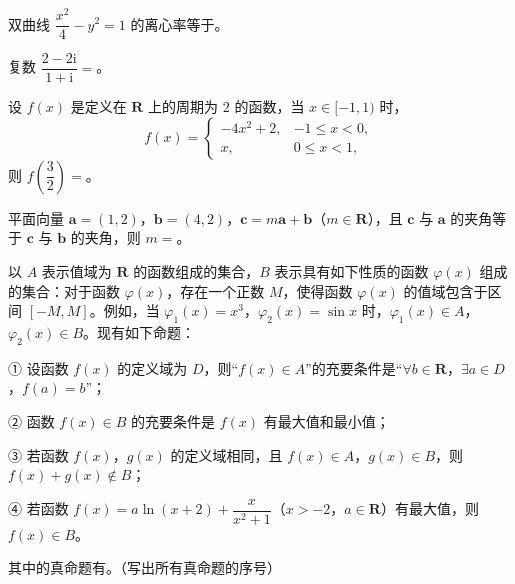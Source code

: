 \begin{question}
双曲线 $\dfrac{x^2}4-y^2=1$ 的离心率等于\gkblank{}。

\end{question}
\begin{question}
复数 $\dfrac{2-2\mathrm i}{1+\mathrm i}=$\gkblank{}。

\end{question}
\begin{question}
设 $f(x)$ 是定义在 $\mathbf R$ 上的周期为 $2$ 的函数，当 $x\in[-1,1)$ 时，
\nopagebreak[4]
\[f(x)=\begin{cases}-4x^2+2,&-1\leqslant x<0,\\x,&0\leqslant x<1,\end{cases}\]
则 $f\left(\dfrac32\right)=$\gkblank{}。

\end{question}
\begin{question}
平面向量 $\boldsymbol a=(1,2)$，$\boldsymbol b=(4,2)$，$\boldsymbol c=m\boldsymbol a+\boldsymbol b$（$m\in\mathbf R$），且 $\boldsymbol c$ 与 $\boldsymbol a$ 的夹角等于 $\boldsymbol c$ 与 $\boldsymbol b$ 的夹角，则 $m=$\gkblank{}。

\end{question}
\begin{question}
以 $A$ 表示值域为 $\mathbf R$ 的函数组成的集合，$B$ 表示具有如下性质的函数 $\varphi(x)$ 组成的集合：对于函数 $\varphi(x)$，存在一个正数 $M$，使得函数 $\varphi(x)$ 的值域包含于区间 $[-M,M]$。例如，当 $\varphi_1(x)=x^3$，$\varphi_2(x)=\sin x$ 时，$\varphi_1(x)\in A$，$\varphi_2(x)\in B$。现有如下命题：

① 设函数 $f(x)$ 的定义域为 $D$，则“$f(x)\in A$”的充要条件是“$\forall b\in\mathbf R$，$\exists a\in D$，$f(a)=b$”；

② 函数 $f(x)\in B$ 的充要条件是 $f(x)$ 有最大值和最小值；

③ 若函数 $f(x)$，$g(x)$ 的定义域相同，且 $f(x)\in A$，$g(x)\in B$，则 $f(x)+g(x)\notin B$；

④ 若函数 $f(x)=a\ln(x+2)+\dfrac{x}{x^2+1}$（$x>-2$，$a\in\mathbf R$）有最大值，则 $f(x)\in B$。

其中的真命题有\gkblank{}。（写出所有真命题的序号）

\end{question}

